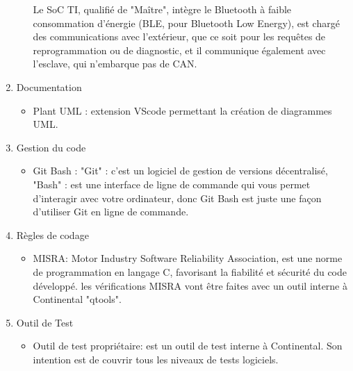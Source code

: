 \documentclass[a4paper, 12pt]{report}
\begin{document}
\begin{enumerate}
\begin{itemize}
        Le SoC TI, qualifié de "Maître", intègre le Bluetooth à faible consommation d'énergie (\acs{BLE}, pour Bluetooth Low Energy), est chargé des communications avec l’extérieur, que ce soit pour les requêtes de reprogrammation ou de diagnostic, et il communique également avec l'esclave, qui n'embarque pas de CAN.
            

        
    \end{itemize}
            
    \item Documentation
    \begin{itemize}
        \item Plant UML : extension VScode permettant la création de diagrammes \acs{UML}.

    
    \end{itemize}
    \item Gestion du code 
        \begin{itemize}
            \item Git Bash : "Git" : c'est un logiciel de gestion de versions décentralisé,  "Bash" : est une interface de ligne de commande qui vous permet d'interagir avec votre ordinateur, donc Git Bash est juste une façon d'utiliser Git en ligne de commande.
        \end{itemize} 

        \item Règles de codage
            \begin{itemize}
                \item \ac{MISRA}: Motor Industry Software Reliability Association, est une norme de programmation en langage C, favorisant la fiabilité et sécurité du code développé. les vérifications MISRA vont être faites avec un outil interne à Continental "qtools".
            \end{itemize}

        \item Outil de Test
            \begin{itemize}
                \item Outil de test propriétaire: est un outil de test interne à Continental. Son intention est de couvrir tous les niveaux de  tests logiciels.
            \end{itemize}
            

\end{enumerate}
\end{document}

